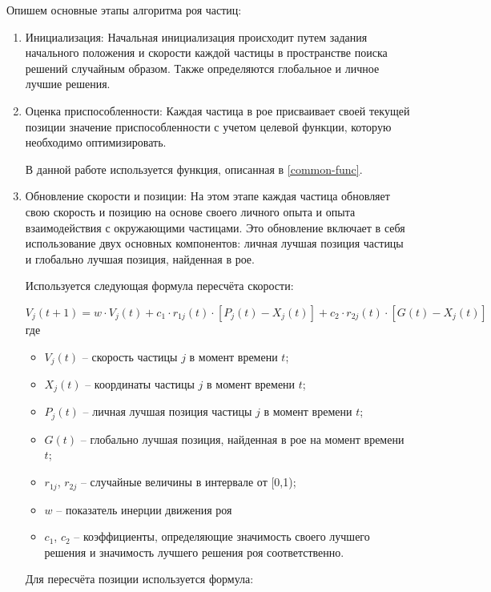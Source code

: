 \documentclass[12pt]{report}
\begin{document}
Опишем основные этапы алгоритма роя частиц: 
\begin{enumerate}
    \item Инициализация: Начальная инициализация происходит путем задания начального положения и скорости каждой частицы в пространстве поиска решений случайным образом. 
    Также определяются глобальное и личное лучшие решения.
    
    \item Оценка приспособленности: Каждая частица в рое присваивает своей текущей позиции значение приспособленности с учетом целевой функции, которую необходимо оптимизировать.

   В данной работе используется функция, описанная в \ref{common-func}.

\item Обновление скорости и позиции:
   На этом этапе каждая частица обновляет свою скорость и позицию на основе своего личного опыта и опыта взаимодействия с окружающими частицами.
   Это обновление включает в себя использование двух основных компонентов: личная лучшая позиция частицы и глобально лучшая позиция, найденная в рое.

   Используется следующая формула пересчёта скорости:

   \begin{equation}
       V_{j}(t + 1) = w \cdot V_{j}(t) + c_{1} \cdot r_{1j}(t) \cdot[P_{j}(t) − X_{j}(t)] + c_{2} \cdot r_{2j}(t) \cdot [G(t) − X_{j}(t)]
   \end{equation}
    где 
    \begin{itemize}
        \item $V_{j}(t)$ -- скорость частицы $j$ в момент времени $t$;
        \item $X_{j}(t)$ -- координаты частицы $j$ в момент времени $t$;
        \item $P_{j}(t)$ -- личная лучшая позиция частицы $j$ в момент времени $t$;
        \item $G(t)$ -- глобально лучшая позиция, найденная в рое на момент времени $t$;
        \item $r_{1j}$, $r_{2j}$ -- случайные величины в интервале от [0,1);
        \item $w$ -- показатель инерции движения роя
        \item $c_1$, $c_2$ -- коэффициенты, определяющие значимость своего лучшего решения и значимость лучшего решения роя соответственно.
    \end{itemize}

    Для пересчёта позиции используется формула:


\end{enumerate}
\end{document}
